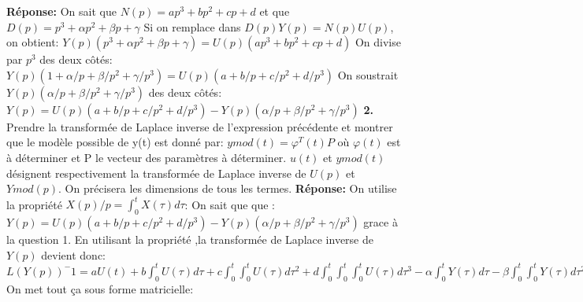 \documentclass[12pt]{article}
\begin{document}
\smallbreak
\textbf{Réponse:}
\smallbreak
On sait que $N(p)=ap^3+bp^2+cp+d$ et que $D(p)=p^3+\alpha p^2+\beta p + \gamma$
\smallbreak
Si on remplace dans $D(p)Y(p)=N(p)U(p)$, on obtient:
\smallbreak
\begin{math}
Y(p)(p^3+\alpha p^2+\beta p + \gamma)=U(p)(ap^3+bp^2+cp+d)
\end{math}
\smallbreak
On divise par $p^3$ des deux côtés:
\smallbreak
\begin{math}
Y(p)(1+\alpha /p+\beta /p^2 + \gamma /p^3)=U(p)(a+b/p+c/p^2+d/p^3)
\end{math}
\smallbreak
On soustrait $Y(p)(\alpha /p+\beta /p^2 + \gamma /p^3)$ des deux côtés:
\smallbreak
\begin{math}
Y(p)=U(p)(a+b/p+c/p^2+d/p^3)-Y(p)(\alpha /p+\beta /p^2 + \gamma /p^3)
\end{math}
\medbreak
\textbf{2.} Prendre la transformée de Laplace inverse de l'expression précédente et montrer que le modèle possible de y(t) est donné par:
\smallbreak
\begin{math}
ymod(t)=\varphi ^T(t)P
\end{math}
\smallbreak
où $\varphi (t)$ est à déterminer et P le vecteur des paramètres à déterminer. $u(t)$ et $ymod(t)$ désignent respectivement la transformée de Laplace inverse de $U(p)$ et $Ymod(p)$. On précisera les dimensions de tous les termes.
\smallbreak
\textbf{Réponse:}
\smallbreak
On utilise la propriété $X(p)/p = \int_{0}^{t} X(\tau) d\tau$:
\smallbreak
On sait que que :
\begin{math}
Y(p)=U(p)(a+b/p+c/p^2+d/p^3)-Y(p)(\alpha /p+\beta /p^2 + \gamma /p^3)
\end{math}
grace à la question 1. 
\smallbreak
En utilisant la propriété ,la transformée de Laplace inverse de $Y(p)$ devient donc:
\smallbreak
\begin{math}
L(Y(p))^-1=a U(t)
 +b \int_{0}^{t} U(\tau) d\tau 
 +c \int_{0}^{t} \int_{0}^{t} U(\tau) d\tau ^2 
 +d \int_{0}^{t} \int_{0}^{t} \int_{0}^{t} U(\tau) d\tau ^3
 -\alpha \int_{0}^{t} Y(\tau) d\tau
 -\beta \int_{0}^{t} \int_{0}^{t} Y(\tau) d\tau ^2
 - \gamma \int_{0}^{t} \int_{0}^{t} \int_{0}^{t} Y(\tau) d\tau ^3
\end{math}
\smallbreak
On met tout ça sous forme matricielle:
\smallbreak
\end{document}
